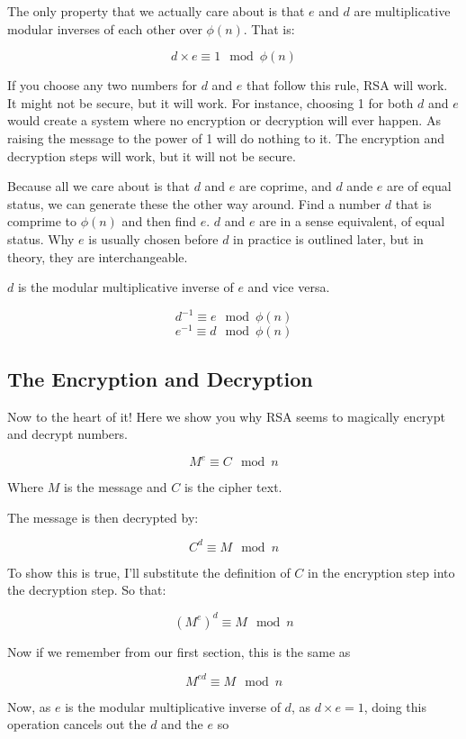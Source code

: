 \documentclass{article}
\begin{document}
  The only property that we actually care about is that $e$ and $d$ are multiplicative
  modular inverses of each other over $\phi(n)$. That is:

  \[ d \times e \equiv 1 \mod \phi(n) \]
  
  If you choose any two numbers for $d$ and $e$ that follow this rule, RSA will
  work. It might not be secure, but it will work. For instance, choosing 1 for
  both $d$ and $e$ would create a system where no encryption or decryption will
  ever happen. As raising the message to the power of 1 will do nothing to it.
  The encryption and decryption steps will work, but it will not be secure.

  Because all we care about is that $d$ and $e$ are coprime, and $d$ ande $e$ are
  of equal status, we can generate these the other way around. Find a number $d$
  that is comprime to $\phi(n)$ and then find $e$. $d$ and $e$ are in a sense
  equivalent, of equal status. Why $e$ is usually chosen before $d$ in practice
  is outlined later, but in theory, they are interchangeable.


  $d$ is the modular multiplicative inverse of $e$ and vice versa.

  \[ d^{-1} \equiv e \mod \phi(n) \]
  \[ e^{-1} \equiv d \mod \phi(n) \]

  \subsection*{The Encryption and Decryption}

  Now to the heart of it! Here we show you why RSA seems to magically encrypt
  and decrypt numbers.

  \[ M^e \equiv C \mod n \]

  Where $M$ is the message and $C$ is the cipher text.

  The message is then decrypted by:

  \[ C^d \equiv M \mod n \]
  
  To show this is true, I'll substitute the definition of $C$ in the encryption
  step into the decryption step. So that:

  \[ (M^e)^d \equiv M \mod n \]

  Now if we remember from our first section, this is the same as

  \[ M^{ed} \equiv M \mod n \]

  Now, as $e$ is the modular multiplicative inverse of $d$, as $d \times e = 1$,
  doing this operation cancels out the $d$ and the $e$ so
\end{document}
